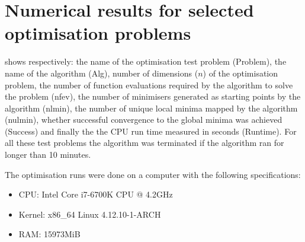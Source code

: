 \appendix
\chapter{Numerical results for selected optimisation problems} \label{sec:nres}
 shows respectively: the name of the optimisation test problem (Problem), the name of the algorithm (Alg), number of dimensions ($n$) of the optimisation problem, the number of function evaluations required by the algorithm to solve the problem (nfev), the number of minimisers generated as starting points by the algorithm (nlmin), the number of unique local minima mapped by the algorithm (nulmin), whether successful convergence to the global minima was achieved (Success) and finally the  the CPU run time measured in seconds (Runtime). For all these test problems the algorithm was terminated if the algorithm ran for longer than 10 minutes.

The optimisation runs were done on a computer with the following specifications:
\begin{itemize}
\item CPU: Intel Core i7-6700K CPU @ 4.2GHz
\item Kernel: x86\_64 Linux 4.12.10-1-ARCH
\item RAM: 15973MiB
\end{itemize}



